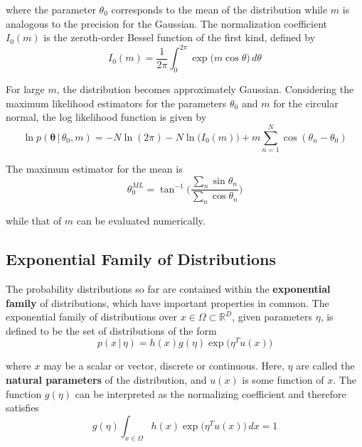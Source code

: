   where the parameter $\theta_0$ corresponds to the mean of the distribution while $m$ is analogous to the precision for the Gaussian. The normalization coefficient $I_0(m)$ is the zeroth-order Bessel function of the first kind, defined by
  \begin{equation}
    I_0(m) = \frac{1}{2\pi} \int_0^{2\pi} \exp \big( m \cos{\theta}\big) \, d\theta
  \end{equation}

  For large $m$, the distribution becomes approximately Gaussian. Considering the maximum likelihood estimators for the parameters $\theta_0$ and $m$ for the circular normal, the log likelihood function is given by
  \begin{equation}
    \ln p(\mathbf{\theta}\,|\, \theta_0, m) = -N \ln(2\pi) - N \ln \big( I_0(m)\big) + m \sum_{n=1}^N \cos(\theta_n - \theta_0)
  \end{equation}

  The maximum estimator for the mean is
  \begin{equation}
    \theta_{0}^{ML} = \tan^{-1} \bigg( \frac{\sum_n \sin{\theta_n}}{\sum_n \cos{\theta_n}} \bigg)
  \end{equation}

  while that of $m$ can be evaluated numerically.

\subsection{Exponential Family of Distributions}

  The probability distributions so far are contained within the \textbf{exponential family} of distributions, which have important properties in common. The exponential family of distributions over $x \in \Omega \subset \mathbb{R}^D$, given parameters $\eta$, is defined to be the set of distributions of the form
  \begin{equation}
    p(x\,|\,\eta) = h(x) g(\eta) \exp\big(\eta^T u(x)\big)
  \end{equation}

  where $x$ may be a scalar or vector, discrete or continuous. Here, $\eta$ are called the \textbf{natural parameters} of the distribution, and $u(x)$ is some function of $x$. The function $g(\eta)$ can be interpreted as the normalizing coefficient and therefore satisfies
  \begin{equation}
    g(\eta) \int_{x \in \Omega} h(x) \exp\big(\eta^T u(x)\big) \, dx = 1
  \end{equation}

